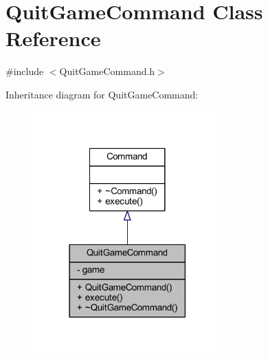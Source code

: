 \hypertarget{class_quit_game_command}{}\section{Quit\+Game\+Command Class Reference}
\label{class_quit_game_command}


{\ttfamily \#include $<$Quit\+Game\+Command.\+h$>$}



Inheritance diagram for Quit\+Game\+Command\+:
\nopagebreak
\begin{figure}[H]
\begin{center}
\leavevmode
\includegraphics[width=206pt]{class_quit_game_command__inherit__graph}
\end{center}
\end{figure}


